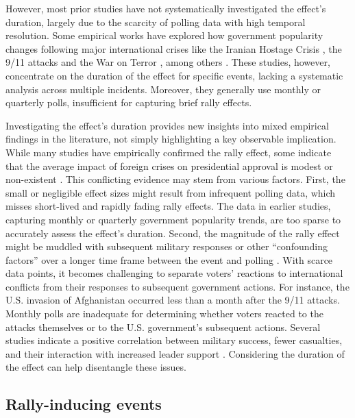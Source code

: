 \documentclass[letterpaper,12pt]{scrartcl}
\begin{document}
However, most prior studies have not systematically investigated the effect's duration, largely due to the scarcity of polling data with high temporal resolution. Some empirical works have explored how government popularity changes following major international crises like the Iranian Hostage Crisis \citep{sigelman1981,callaghan1993}, the 9/11 attacks and the War on Terror \citep{Schubert2002PolitPsychol,hetherington2003,Eichenberg2006JCR,Kam2008POQ}, among others \citep{Parker1995POQ,edwards1997,jentleson1998,Lai2005ISQ}. These studies, however, concentrate on the duration of the effect for specific events, lacking a systematic analysis across multiple incidents. Moreover, they generally use monthly or quarterly polls, insufficient for capturing brief rally effects.

Investigating the effect's duration provides new insights into mixed empirical findings in the literature, not simply highlighting a key observable implication. While many studies have empirically confirmed the rally effect, some indicate that the average impact of foreign crises on presidential approval is modest or non-existent \citep{Lian1993JCR,Oneal1995PolitBehav,Baker2001JCR}. This conflicting evidence may stem from various factors. First, the small or negligible effect sizes might result from infrequent polling data, which misses short-lived and rapidly fading rally effects. The data in earlier studies, capturing monthly or quarterly government popularity trends, are too sparse to accurately assess the effect's duration. Second, the magnitude of the rally effect might be muddled with subsequent military responses or other ``confounding factors'' over a longer time frame between the event and polling \citep{James1998PRQ}. With scarce data points, it becomes challenging to separate voters' reactions to international conflicts from their responses to subsequent government actions. For instance, the U.S. invasion of Afghanistan occurred less than a month after the 9/11 attacks. Monthly polls are inadequate for determining whether voters reacted to the attacks themselves or to the U.S. government's subsequent actions. Several studies indicate a positive correlation between military success, fewer casualties, and their interaction with increased leader support \citep{eichenberg2005victory,gartner2008,kuijpers2019,umitforthcoming}. Considering the duration of the effect can help disentangle these issues.

\subsection*{Rally-inducing events}
\end{document}
